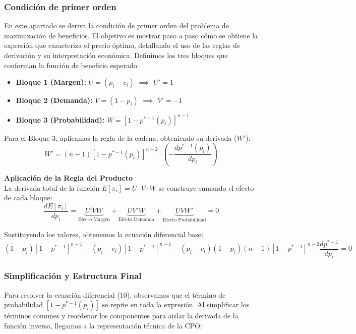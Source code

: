 \documentclass[12pt]{article}
\begin{document}
\subsubsection{Condición de primer orden} 
En este apartado se deriva la condición de primer orden del problema de maximización de beneficios. El objetivo es mostrar paso a paso cómo se obtiene la expresión que caracteriza el precio óptimo, detallando el uso de las reglas de derivación y su interpretación económica.
Definimos los tres bloques que conforman la función de beneficio esperado:
\begin{itemize}
    \item \textbf{Bloque 1 (Margen):} $U = (p_i - c_i)$ \quad $\implies$ \quad $U' = 1$
    \item \textbf{Bloque 2 (Demanda):} $V = (1 - p_i)$ \quad $\implies$ \quad $V' = -1$
    \item \textbf{Bloque 3 (Probabilidad):} $W = [1 - p^{*-1}(p_i)]^{n-1}$ 
\end{itemize}

Para el Bloque 3, aplicamos la regla de la cadena, obteniendo su derivada ($W'$):
\begin{equation}
    W' = (n-1) [1 - p^{*-1}(p_i)]^{n-2} \cdot \left( - \frac{d p^{*-1}(p_i)}{d p_i} \right)
\end{equation}

\noindent \textbf{Aplicación de la Regla del Producto} \\
La derivada total de la función $E[\pi_i] = U \cdot V \cdot W$ se construye sumando el efecto de cada bloque:
\begin{equation}
    \frac{d E[\pi_i]}{d p_i} = \underbrace{U'VW}_{\text{Efecto Margen}} + \underbrace{UV'W}_{\text{Efecto Demanda}} + \underbrace{UVW'}_{\text{Efecto Probabilidad}} = 0
\end{equation}

Sustituyendo los valores, obtenemos la ecuación diferencial base:
\begin{equation}
    (1-p_i)[1-p^{*-1}]^{n-1} - (p_i-c_i)[1-p^{*-1}]^{n-1} - (p_i-c_i)(1-p_i)(n-1)[1-p^{*-1}]^{n-2} \frac{d p^{*-1}}{d p_i} = 0
\end{equation}

\subsubsection{Simplificación y Estructura Final}

Para resolver la ecuación diferencial (10), observamos que el término de probabilidad $[1 - p^{*-1}(p_i)]$ se repite en toda la expresión. Al simplificar los términos comunes y reordenar los componentes para aislar la derivada de la función inversa, llegamos a la representación técnica de la CPO:
\end{document}
